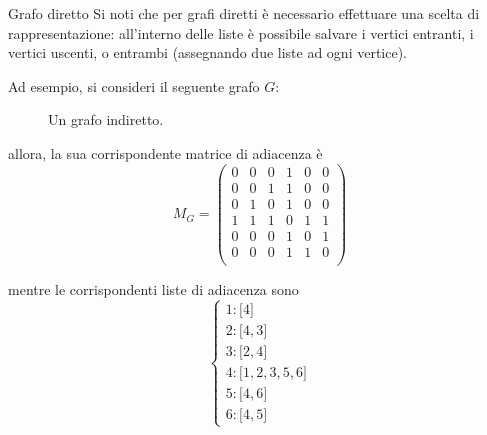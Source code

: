 \documentclass[a4paper, 12pt]{report}
\begin{document}
    \begin{framedobs}{Grafo diretto}
        Si noti che per grafi diretti è necessario effettuare una scelta di rappresentazione: all'interno delle liste è possibile salvare i vertici entranti, i vertici uscenti, o entrambi (assegnando due liste ad ogni vertice).
    \end{framedobs}

    \begin{example}
        Ad esempio, si consideri il seguente grafo $G$:

        \begin{figure}[H]
            \centering
            \caption{Un grafo indiretto.}
        \end{figure}

        allora, la sua corrispondente matrice di adiacenza è
        $$M_G = \left( \begin{array}{llllll}
            0 & 0 & 0 & 1 & 0 & 0 \\
            0 & 0 & 1 & 1 & 0 & 0 \\
            0 & 1 & 0 & 1 & 0 & 0 \\
            1 & 1 & 1 & 0 & 1 & 1 \\
            0 & 0 & 0 & 1 & 0 & 1 \\
            0 & 0 & 0 & 1 & 1 & 0 \\
        \end{array} \right)$$

        mentre le corrispondenti liste di adiacenza sono $$\left \{ \begin{array}{l} 1: \texttt{[}4\texttt{]} \\ 2: \texttt{[}4, 3\texttt{]} \\ 3: \texttt{[}2, 4\texttt{]} \\ 4: \texttt{[}1, 2, 3, 5, 6\texttt{]} \\ 5: \texttt{[}4, 6\texttt{]} \\ 6: \texttt{[}4, 5\texttt{]} \end{array} \right.$$
    \end{example}
\end{document}
